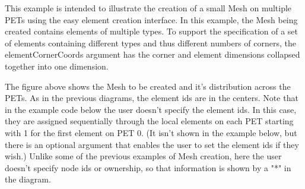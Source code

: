    This example is intended to illustrate the creation of a small Mesh on multiple PETs using the easy element creation interface. 
   In this example, the Mesh being created contains elements of multiple types.
   To support the specification of a set of elements containing different types and thus different 
   numbers of corners, the elementCornerCoords argument has the 
   corner and element dimensions collapsed together into one dimension.
  
   The figure above shows the Mesh to be created and it's distribution across the PETs. As in the previous diagrams, the element ids are in the centers. 
   Note that in the example code below the user doesn't specify the element ids. In this case, they are assigned sequentially
   through the local elements on each PET starting with 1 for the first element on PET 0. (It isn't shown in the example below, but there is
   an optional argument that enables the user to set the element ids if they wish.) 
   Unlike some of the previous examples of Mesh creation, here the user doesn't specify node ids or ownership, so that information is shown by a "*" in 
   the diagram. 
 
   

